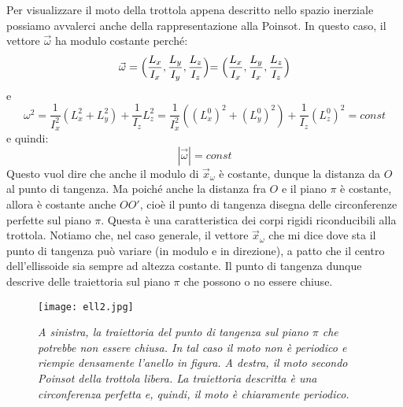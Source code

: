 \documentclass[a4paper,openany]{article}
\begin{document}
	Per visualizzare il moto della trottola appena descritto nello spazio inerziale possiamo avvalerci anche della rappresentazione alla Poinsot. In questo caso, il vettore $\vec{\omega}$ ha modulo costante perché:
	$$
	\vec{\omega} = \Bigl(\dfrac{L_x}{I_x},\dfrac{L_y}{I_y},\dfrac{L_z}{I_z}\Bigl) = \Bigl(\dfrac{L_x}{I_x},\dfrac{L_y}{I_x},\dfrac{L_z}{I_z}\Bigl) 
	$$ 
	e
	$$
	\omega^2 = \dfrac{1}{I_x^2}(L_x^2+L_y^2) + \dfrac{1}{I_z}L_z^2 = \dfrac{1}{I_x^2}((L_x^0)^2+(L_y^0)^2) + \dfrac{1}{I_z}(L_z^0)^2 = const
	$$
	e quindi:
	$$
	|\vec{\omega}| = const
	$$
	Questo vuol dire che anche il modulo di $\vec{x}_{\omega}$ è costante, dunque la distanza da $O$ al punto di tangenza. Ma poiché anche la distanza fra $O$ e il piano $\pi$ è costante, allora è costante anche $OO'$, cioè il punto di tangenza disegna delle circonferenze perfette sul piano $\pi$. Questa è una caratteristica dei corpi rigidi riconducibili alla trottola. Notiamo che, nel caso generale, il vettore $\vec{x}_{\omega}$ che mi dice dove sta il punto di tangenza può variare (in modulo e in direzione), a patto che il centro dell'ellissoide sia sempre ad altezza costante. Il punto di tangenza dunque descrive delle traiettoria sul piano $\pi$ che possono o no essere chiuse.
	\begin{figure}[H]
		\centering
		\texttt{[image: ell2.jpg]}
		\caption{\textit{A sinistra, la traiettoria del punto di tangenza sul piano $\pi$ che potrebbe non essere chiusa. In tal caso il moto non è periodico e riempie densamente l'anello in figura. A destra, il moto secondo Poinsot della trottola libera. La traiettoria descritta è una circonferenza perfetta e, quindi, il moto è chiaramente periodico.}}
	\end{figure}
\end{document}
